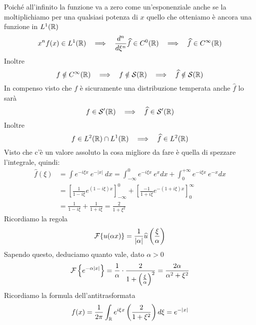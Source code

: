 Poiché all'infinito la funzione va a zero come un'esponenziale anche se la moltiplichiamo per una qualsiasi potenza di $x$ quello che otteniamo è ancora una funzione in $L^{1} (\mathbb{R})$
\begin{equation*}
x^{n} f(x)\in L^{1} (\RR)\ \ \implies \ \ \frac{d^{n}}{d\xi^{n}}\hat{f} \in C^{0}(\RR) \ \ \implies \ \ \hat{f} \in C^{\infty} (\RR)
\end{equation*}
Inoltre
\begin{equation*}
f\notin C^{\infty} (\mathbb{R})\ \ \implies \ \ f\notin \mathcal{S} (\mathbb{R}) \ \ \implies \ \ \widehat{f} \notin \mathcal{S} (\mathbb{R})
\end{equation*}
In compenso visto che $f$ è sicuramente una distribuzione temperata anche $\hat{f}$ lo sarà
\begin{equation*}
f\in \Sc '(\RR) \ \ \implies \ \ \hat{f} \in \Sc '(\RR)
\end{equation*}
Inoltre
\begin{equation*}
f\in L^{2}(\RR) \cap L^{1}(\RR) \ \ \implies \ \ \hat{f} \in L^{2}(\RR)
\end{equation*}
Visto che c'è un valore assoluto la cosa migliore da fare è quella di spezzare l'integrale, quindi:
\begin{equation*}
\begin{aligned}
\hat{f} (\xi) & = \int e^{- i\xi x} \ e^{- |x|} \ dx = \int^{0}_{- \infty} e^{- i\xi x} \ e^{x} dx + \int^{+ \infty}_{0} e^{- i\xi x} \ e^{- x} dx\\
 & = \left[\frac{1}{1 - i\xi} e^{(1 - i\xi) x}\right]^{0}_{- \infty} + \left[\frac{- 1}{1 + i\xi} e^{- (1 + i\xi) x}\right]^{\infty}_{0}\\
 & = \frac{1}{1 - i\xi} + \frac{1}{1 + i\xi} = \frac{2}{1 + \xi^{2}}
\end{aligned}
\end{equation*}
Ricordiamo la regola
\begin{equation*}
\mathcal{F} \{u(\alpha x)\} = \frac{1}{| \alpha |}\widehat{u}\left(\frac{\xi}{\alpha}\right)
\end{equation*}
Sapendo questo, deduciamo quanto vale, dato $\alpha > 0$
\begin{equation*}
\mathcal{F} \left\{e^{- \alpha | x|}\right\} = \frac{1}{\alpha} \cdot \frac{2}{1 + \left(\frac{\xi}{\alpha}\right)^{2}} = \frac{2\alpha}{\alpha^{2} + \xi^{2}}
\end{equation*}
Ricordiamo la formula dell'antitrasformata
\begin{equation*}
f(x) = \frac{1}{2\pi}\int_{\mathbb{R}} e^{i\xi x}\left(\frac{2}{1 + \xi^{2}}\right) d\xi = e^{- |x|}
\end{equation*}

